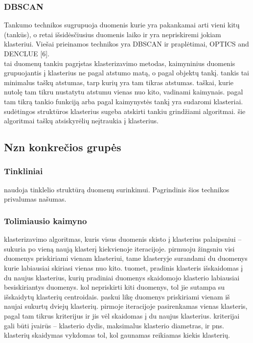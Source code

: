 \documentclass{VUMIFInfKursinis}
\begin{document}
		\subsubsection{DBSCAN}
		Tankumo technikos sugrupuoja duomenis kurie yra pakankamai arti vieni kitų (tankūs), o retai išsidėsčiusius duomenis laiko  ir yra nepriskiremi jokiam klasteriui. Viešai prieinamos technikos yra DBSCAN ir praplėtimai, OPTICS and DENCLUE [6].\\
			 tai duomenų tankiu pagrįstas klasterizavimo metodas, kaimyninius duomenis grupuojantis į klasterius ne pagal atstumo matą, o pagal objektų tankį. tankis tai minimalus taškų atstumas, tarp kurių yra tam tikras atstumas. taškai, kurie nutolę tam tikru nustatytu atstumu vienas nuo kito, vadinami kaimynais. pagal tam tikrą tankio funkciją arba pagal kaimynystės tankį yra sudaromi klasteriai. sudėtingos struktūros klasterius sugeba atskirti tankiu grindžiami algoritmai. šie algoritmai taškų atsiskyrėlių neįtraukia į klasterius.

	\subsection{Nzn konkrečios grupės}	

		\subsubsection{Tinkliniai}
			 naudoja  tinklelio struktūrą duomenų surinkimui. Pagrindinis šios technikos privalumas \textendash{} našumas.\\
		\subsubsection{Tolimiausio kaimyno}
			klasterizavimo algoritmas, kuris visus duomenis skisto į klasterius palaipsniui – sukuria po vieną naują klasterį kiekvienoje iteracijoje. pirmuoju žingsniu visi duomenys priskiriami vienam klasteriui, tame klasteryje surandami du duomenys kurie labiausiai skiriasi vienas nuo kito. tuomet, pradinis klasteris išskaidomas į du naujus klasterius, kurių pradiniai duomenys skaidomojo klasterio labiausiai besiskiriantys duomenys. kol nepriskirti kiti duomenys, tol jie sutampa su išskaidytų klasterių centroidais. paskui likę duomenys priskiriami vienam iš naujai sukurtų dviejų klasterių. pirmoje iteracijoje pasirenkamas vienas klasteris, pagal tam tikrus kriterijus ir jis vėl skaidomas į du naujus klasterius. kriterijai gali būti įvairūs – klasterio dydis, maksimalus klasterio diametras, ir pns. klasterių skaidymas vykdomas tol, kol gaunamas reikiamas kiekis klasterių.\\
\end{document}
